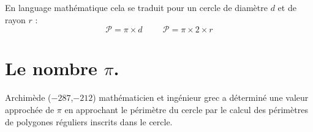 \documentclass[a4paper,dvipsnames]{article}
\begin{document}
\begin{Nt}
En language mathématique cela se traduit pour un cercle de diamètre $d$ et de rayon $r$ :
\[\mathcal{P}=\pi \times d\hspace{1cm} \mathcal{P}=\pi\times 2\times r\]
\end{Nt}

\section{Le nombre $\pi$.}

\begin{His}
Archimède ($-287$,$-212$) mathématicien et ingénieur grec a déterminé une valeur approchée de $\pi$ en approchant le périmètre du cercle par le calcul des périmètres de polygones réguliers inscrits dans le cercle.


\end{His}
\end{document}
